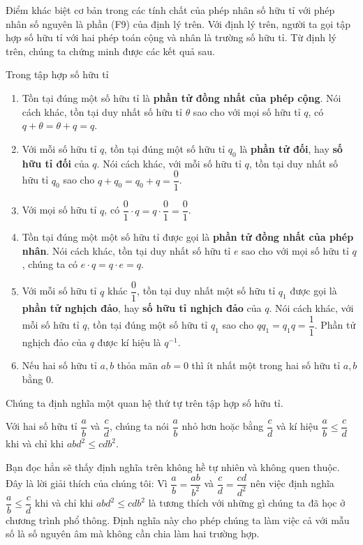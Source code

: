 Điểm khác biệt cơ bản trong các tính chất của phép nhân số hữu tỉ với phép nhân số nguyên là phần (F9) của định lý trên. Với định lý trên, người ta gọi tập hợp số hữu tỉ với hai phép toán cộng và nhân là trường số hữu tỉ. Từ định lý trên, chúng ta chứng minh được các kết quả sau.
\begin{theorem}
    Trong tập hợp số hữu tỉ
    \begin{enumerate}[label={(\roman*)}]
        \item Tồn tại đúng một số hữu tỉ là \textbf{phần tử đồng nhất của phép cộng}. Nói cách khác, tồn tại duy nhất số hữu tỉ $\theta$ sao cho với mọi số hữu tỉ $q$, có $q + \theta = \theta + q = q$.
        \item Với mỗi số hữu tỉ $q$, tồn tại đúng một số hữu tỉ $q_{0}$ là \textbf{phần tử đối}, hay \textbf{số hữu tỉ đối} của $q$. Nói cách khác, với mỗi số hữu tỉ $q$, tồn tại duy nhất số hữu tỉ $q_{0}$ sao cho $q + q_{0} = q_{0} + q = \dfrac{0}{1}$.
        \item Với mọi số hữu tỉ $q$, có $\dfrac{0}{1}\cdot q = q\cdot\dfrac{0}{1} = \dfrac{0}{1}$.
        \item Tồn tại đúng một một số hữu tỉ được gọi là \textbf{phần tử đồng nhất của phép nhân}. Nói cách khác, tồn tại duy nhất số hữu tỉ $e$ sao cho với mọi số hữu tỉ $q$, chúng ta có $e\cdot q = q\cdot e = q$.
        \item Với mỗi số hữu tỉ $q$ khác $\dfrac{0}{1}$, tồn tại duy nhất một số hữu tỉ $q_{1}$ được gọi là \textbf{phần tử nghịch đảo}, hay \textbf{số hữu tỉ nghịch đảo} của $q$. Nói cách khác, với mỗi số hữu tỉ $q$, tồn tại đúng một số hữu tỉ $q_{1}$ sao cho $qq_{1} = q_{1}q = \dfrac{1}{1}$. Phần tử nghịch đảo của $q$ được kí hiệu là $q^{-1}$.
        \item Nếu hai số hữu tỉ $a, b$ thỏa mãn $ab = 0$ thì ít nhất một trong hai số hữu tỉ $a, b$ bằng $0$.
    \end{enumerate}
\end{theorem}

Chúng ta định nghĩa một quan hệ thứ tự trên tập hợp số hữu tỉ.
\begin{definition}
    Với hai số hữu tỉ $\dfrac{a}{b}$ và $\dfrac{c}{d}$, chúng ta nói $\dfrac{a}{b}$ nhỏ hơn hoặc bằng $\dfrac{c}{d}$ và kí hiệu $\dfrac{a}{b}\leq \dfrac{c}{d}$ khi và chỉ khi $abd^{2} \leq cdb^{2}$.
\end{definition}

Bạn đọc hẳn sẽ thấy định nghĩa trên không hề tự nhiên và không quen thuộc. Đây là lời giải thích của chúng tôi: Vì $\dfrac{a}{b} = \dfrac{ab}{b^{2}}$ và $\dfrac{c}{d} = \dfrac{cd}{d^{2}}$ nên việc định nghĩa $\dfrac{a}{b}\leq \dfrac{c}{d}$ khi và chỉ khi $abd^{2} \leq cdb^{2}$ là tương thích với những gì chúng ta đã học ở chương trình phổ thông. Định nghĩa này cho phép chúng ta làm việc cả với mẫu số là số nguyên âm mà không cần chia làm hai trường hợp.

